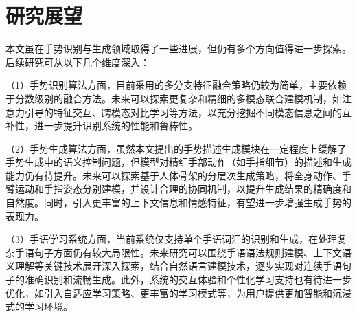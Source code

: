 \section{研究展望}
本文虽在手势识别与生成领域取得了一些进展，但仍有多个方向值得进一步探索。后续研究可从以下几个维度深入：

（1）手势识别算法方面，目前采用的多分支特征融合策略仍较为简单，主要依赖于分数级别的融合方法。未来可以探索更复杂和精细的多模态联合建模机制，如注意力引导的特征交互、跨模态对比学习等方法，以充分挖掘不同模态信息之间的互补性，进一步提升识别系统的性能和鲁棒性。

（2）手势生成算法方面，虽然本文提出的手势描述生成模块在一定程度上缓解了手势生成中的语义控制问题，但模型对精细手部动作（如手指细节）的描述和生成能力仍有待提升。未来可以探索基于人体骨架的分层次生成策略，将全身动作、手臂运动和手指姿态分别建模，并设计合理的协同机制，以提升生成结果的精确度和自然度。同时，引入更丰富的上下文信息和情感特征，有望进一步增强生成手势的表现力。

（3）手语学习系统方面，当前系统仅支持单个手语词汇的识别和生成，在处理复杂手语句子方面仍有较大局限性。未来研究可以围绕手语语法规则建模、上下文语义理解等关键技术展开深入探索，结合自然语言建模技术，逐步实现对连续手语句子的准确识别和流畅生成。此外，系统的交互体验和个性化学习支持也有待进一步优化，如引入自适应学习策略、更丰富的学习模式等，为用户提供更加智能和沉浸式的学习环境。